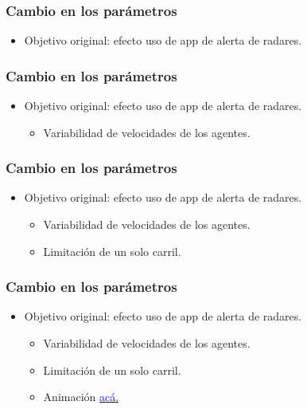 \documentclass[10pt, compress]{beamer}
\begin{document}
\begin{frame}[fragile]
\frametitle{Cambio en los par\'ametros}

\begin{itemize}
\item Objetivo original: efecto uso de app de alerta de radares.
\end{itemize}

\end{frame}

\begin{frame}[fragile]
\frametitle{Cambio en los par\'ametros}

\begin{itemize}
\item Objetivo original: efecto uso de app de alerta de radares.
	\begin{itemize}
	\item Variabilidad de velocidades de los agentes.
	\end{itemize}
\end{itemize}

\end{frame}

\begin{frame}[fragile]
\frametitle{Cambio en los par\'ametros}

\begin{itemize}
\item Objetivo original: efecto uso de app de alerta de radares.
	\begin{itemize}
	\item Variabilidad de velocidades de los agentes.
	\item Limitaci\'on de un solo carril.
	\end{itemize}
\end{itemize}

\end{frame}

\begin{frame}[fragile]
\frametitle{Cambio en los par\'ametros}

\begin{itemize}
\item Objetivo original: efecto uso de app de alerta de radares.
	\begin{itemize}
	\item Variabilidad de velocidades de los agentes.
	\item Limitaci\'on de un solo carril.
	\item Animaci\'on \href{https://youtu.be/NnljPUTmnGE}{\textcolor{blue}{ac\'a.}}
	\end{itemize}
\end{itemize}
\end{frame}
\end{document}
